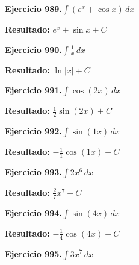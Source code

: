 \documentclass[10pt,a4paper]{article}
\begin{document}
\begin{ejbox}
\textbf{Ejercicio 989.}\quad $\int (e^x + \cos x)\,dx$
\end{ejbox}

\begin{solbox}
\textbf{Resultado:} \(\displaystyle e^x + \sin x + C\)
\end{solbox}

\begin{ejbox}
\textbf{Ejercicio 990.}\quad $\int \frac{1}{x}\,dx$
\end{ejbox}

\begin{solbox}
\textbf{Resultado:} \(\displaystyle \ln|x| + C\)
\end{solbox}

\newpage
\begin{ejbox}
\textbf{Ejercicio 991.}\quad $\int \cos(2x)\,dx$
\end{ejbox}

\begin{solbox}
\textbf{Resultado:} \(\displaystyle \frac{1}{2}\sin(2x) + C\)
\end{solbox}

\begin{ejbox}
\textbf{Ejercicio 992.}\quad $\int \sin(1x)\,dx$
\end{ejbox}

\begin{solbox}
\textbf{Resultado:} \(\displaystyle -\frac{1}{1}\cos(1x) + C\)
\end{solbox}

\begin{ejbox}
\textbf{Ejercicio 993.}\quad $\int 2x^{6}\,dx$
\end{ejbox}

\begin{solbox}
\textbf{Resultado:} \(\displaystyle \frac{2}{7}x^{7} + C\)
\end{solbox}

\newpage
\begin{ejbox}
\textbf{Ejercicio 994.}\quad $\int \sin(4x)\,dx$
\end{ejbox}

\begin{solbox}
\textbf{Resultado:} \(\displaystyle -\frac{1}{4}\cos(4x) + C\)
\end{solbox}

\begin{ejbox}
\textbf{Ejercicio 995.}\quad $\int 3x^{7}\,dx$
\end{ejbox}
\end{document}
